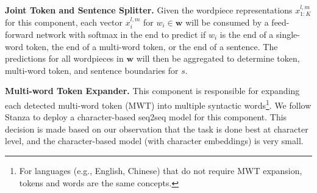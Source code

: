 \documentclass[11pt,a4paper]{article}
\begin{document}
\vspace{0.3cm}

\noindent \textbf{Joint Token and Sentence Splitter.} Given the wordpiece representations $x^{l,m}_{1:K}$ for this component, each vector $x^{l,m}_i$ for $w_i \in \textbf{w}$ will be consumed by a feed-forward network with softmax in the end to predict if $w_i$ is the end of a single-word token, the end of a multi-word token, or the end of a sentence. The predictions for all wordpieces in $\textbf{w}$ will then be aggregated to determine token, multi-word token, and sentence boundaries for $s$.





\vspace{0.3cm}

\noindent \textbf{Multi-word Token Expander.} This component is responsible for expanding each detected multi-word token (MWT) into multiple syntactic words\footnote{For languages (e.g., English, Chinese) that do not require MWT expansion, tokens and words are the same concepts.}. We follow Stanza to deploy a character-based seq2seq model for this component. This decision is made based on our observation that the task is done best at character level, and the character-based model (with character embeddings) is very small.
\end{document}
